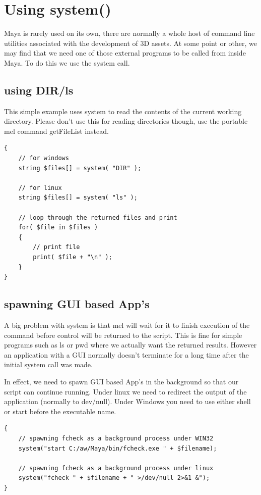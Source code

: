 \section{Using system()}
Maya is rarely used on its own, there are normally a whole host of command line utilities associated with the development of 3D assets. At some point or other, we may find that we need one of those external programs to be called from inside Maya. To do this we use the system call.

\subsection{using DIR/ls}
This simple example uses system to read the contents of the current working directory. Please don't use this for reading directories though, use the portable mel command getFileList instead.

\begin{lstlisting}
{
	// for windows
	string $files[] = system( "DIR" );
	
	// for linux
	string $files[] = system( "ls" );
	
	// loop through the returned files and print
	for( $file in $files )
	{
		// print file
		print( $file + "\n" );
	}
}
\end{lstlisting}

\subsection{spawning GUI based App's}
A big problem with system is that mel will wait for it to finish execution of the command before control will be returned to the script. This is fine for simple programs such as ls or pwd where we actually want the returned results. However an application with a GUI normally doesn't terminate for a long time after the initial system call was made.

In effect, we need to spawn GUI based App's in the background so that our script can continue running. Under linux we need to redirect the output of the application (normally to dev/null). Under Windows you need to use either shell or start before the executable name.

\begin{lstlisting}
{
	// spawning fcheck as a background process under WIN32
	system("start C:/aw/Maya/bin/fcheck.exe " + $filename);
	
	// spawning fcheck as a background process under linux
	system("fcheck " + $filename + " >/dev/null 2>&1 &");
}
\end{lstlisting}